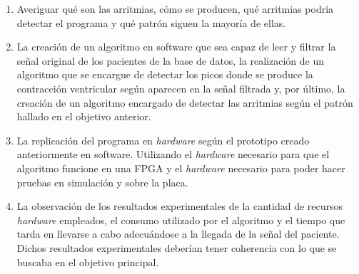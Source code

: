 \begin{enumerate}
    \item Averiguar qué son las arritmias, cómo se producen, qué arritmias podría detectar el programa y qué patrón siguen la mayoría de ellas.
    \item La creación de un algoritmo en software que sea capaz de leer y filtrar la señal original de los pacientes de la base de datos, la realización de un algoritmo que se encargue de detectar los picos donde se produce la contracción ventricular según aparecen en la señal filtrada y, por último, la creación de un algoritmo encargado de detectar las arritmias según el patrón hallado en el objetivo anterior.
    \item La replicación del programa en  \textit{hardware}  según el prototipo creado anteriormente en software. Utilizando el  \textit{hardware}  necesario para que el algoritmo funcione en una FPGA y el  \textit{hardware}  necesario para poder hacer pruebas en simulación y sobre la placa.
    \item La observación de los resultados experimentales de la cantidad de recursos  \textit{hardware}  empleados, el consumo utilizado por el algoritmo y el tiempo que tarda en llevarse a cabo adecuándose a la llegada de la señal del paciente. Dichos resultados experimentales deberían tener coherencia con lo que se buscaba en el objetivo principal.
\end{enumerate}


